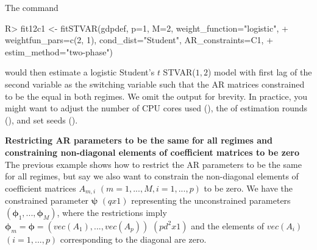 \documentclass[nojss]{jss}
\begin{document}
%
The command
\begin{CodeChunk}
\begin{CodeInput}
R> fit12c1 <- fitSTVAR(gdpdef, p=1, M=2, weight_function="logistic",
+    weightfun_pars=c(2, 1), cond_dist="Student", AR_constraints=C1,
+    estim_method="two-phase")
\end{CodeInput}
\end{CodeChunk}
would then estimate a logistic Student's $t$ STVAR($1,2$) model with first lag of the second variable as the switching variable such that the AR matrices constrained to be the equal in both regimes. We omit the output for brevity. In practice, you might want to adjust the number of CPU cores used (), the of estimation rounds (), and set seeds ().

\textbf{Restricting AR parameters to be the same for all regimes and constraining non-diagonal elements of coefficient matrices to be zero}\\
The previous example shows how to restrict the AR parameters to be the same for all regimes, but say we also want to constrain the non-diagonal elements of coefficient matrices $A_{m,i}$ $(m=1,...,M, i=1,...,p)$ to be zero. We have the constrained parameter $\boldsymbol{\psi}$ $(qx1)$ representing the unconstrained parameters $(\boldsymbol{\phi}_1,...,\boldsymbol{\phi}_M)$, where the restrictions imply $\boldsymbol{\phi}_m=\boldsymbol{\phi}=(vec(A_1),...,vec(A_p))$ $(pd^2x1)$ and the elements of $vec(A_i)$ $(i=1,...,p)$ corresponding to the diagonal are zero.
\end{document}
